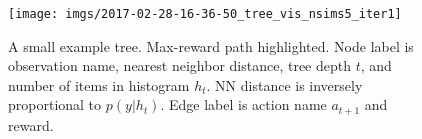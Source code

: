 \documentclass[letterpaper, 10 pt, conference]{ieeeconf}  %
\begin{document}
\begin{figure}[thbp]
  \begin{center}
    \texttt{[image: imgs/2017-02-28-16-36-50\_tree\_vis\_nsims5\_iter1]}  %
  \end{center}
  \caption{A small example tree. Max-reward path highlighted. Node label is observation name, nearest neighbor distance, tree depth $t$, and number of items in histogram $h_t$. NN distance is inversely proportional to $p(y|h_t)$. Edge label is action name $a_{t+1}$ and reward.}
  \label{fig:tree}
\end{figure}






\end{document}
